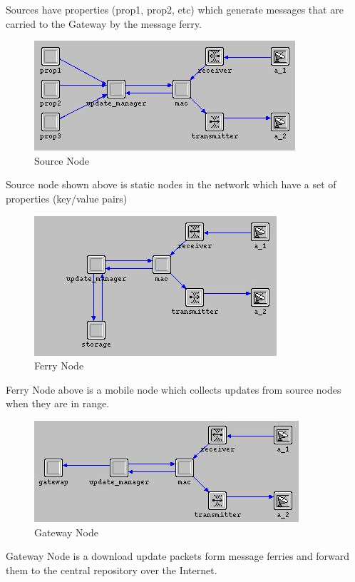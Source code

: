 %

Sources have properties (prop1, prop2, etc) which generate messages that are carried to the Gateway by the message ferry.

\begin{figure}[h]
    \centering
    \includegraphics[width=.5\textwidth]{images/source}
    \caption{Source Node}
    \label{fig:source}
\end{figure}

Source node shown above is static nodes in the network which have a set of properties (key/value pairs) 	

\begin{figure}[h]
    \centering
    \includegraphics[width=.5\textwidth]{images/ferry}
    \caption{Ferry Node}
    \label{fig:Ferry}
\end{figure}

Ferry Node above is a mobile node which collects updates from source nodes when they are in range.


\begin{figure}[h]
    \centering
    \includegraphics[width=.5\textwidth]{images/gateway}
    \caption{Gateway Node}
    \label{fig:Gateway}
\end{figure}

Gateway Node is a download update packets form message ferries and forward them to the central repository over the Internet.




